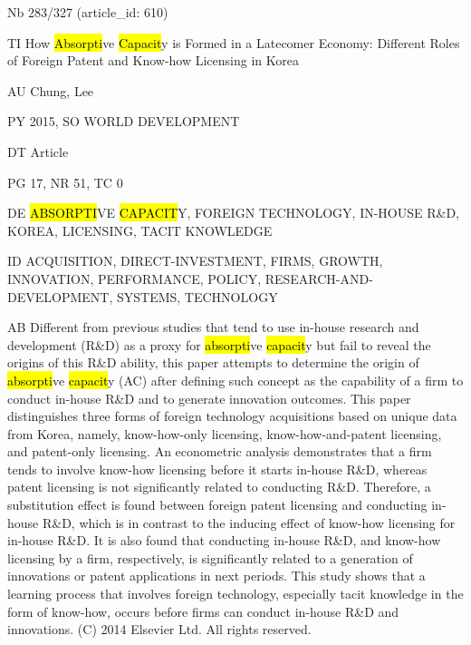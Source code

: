 \documentclass[a4paper]{article}
\begin{document}
\vspace*{-2cm}
Nb \tabto{0cm}283/327 (article\_id: 610)\par
TI \tabto{0cm}How \hl{Absorpti}ve \hl{Capacit}y is Formed in a Latecomer Economy: Different Roles of Foreign Patent and Know-how Licensing in Korea\par
AU \tabto{0cm}Chung, Lee\par
PY \tabto{0cm}2015, SO WORLD DEVELOPMENT\par
DT \tabto{0cm}Article\par
PG \tabto{0cm}17, NR 51, TC 0\par
DE \tabto{0cm}\hl{ABSORPTI}VE \hl{CAPACIT}Y, FOREIGN TECHNOLOGY, IN-HOUSE R\&D, KOREA, LICENSING, TACIT KNOWLEDGE\par
ID \tabto{0cm}ACQUISITION, DIRECT-INVESTMENT, FIRMS, GROWTH, INNOVATION, PERFORMANCE, POLICY, RESEARCH-AND-DEVELOPMENT, SYSTEMS, TECHNOLOGY\par
AB \tabto{0cm}Different from previous studies that tend to use in-house research and development (R\&D) as a proxy for \hl{absorpti}ve \hl{capacit}y but fail to reveal the origins of this R\&D ability, this paper attempts to determine the origin of \hl{absorpti}ve \hl{capacit}y (AC) after defining such concept as the capability of a firm to conduct in-house R\&D and to generate innovation outcomes. This paper distinguishes three forms of foreign technology acquisitions based on unique data from Korea, namely, know-how-only licensing, know-how-and-patent licensing, and patent-only licensing. An econometric analysis demonstrates that a firm tends to involve know-how licensing before it starts in-house R\&D, whereas patent licensing is not significantly related to conducting R\&D. Therefore, a substitution effect is found between foreign patent licensing and conducting in-house R\&D, which is in contrast to the inducing effect of know-how licensing for in-house R\&D. It is also found that conducting in-house R\&D, and know-how licensing by a firm, respectively, is significantly related to a generation of innovations or patent applications in next periods. This study shows that a learning process that involves foreign technology, especially tacit knowledge in the form of know-how, occurs before firms can conduct in-house R\&D and innovations. (C) 2014 Elsevier Ltd. All rights reserved.\par
\clearpage
\end{document}
